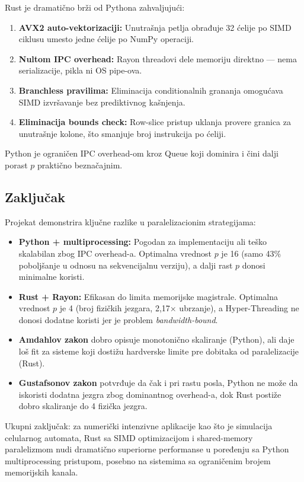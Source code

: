 \documentclass[12pt,a4paper]{article}
\begin{document}
Rust je dramatično brži od Pythona zahvaljujući:
\begin{enumerate}[noitemsep]
    \item \textbf{AVX2 auto-vektorizaciji:} Unutrašnja petlja obrađuje 32 ćelije po SIMD ciklusu
          umesto jedne ćelije po NumPy operaciji.
    \item \textbf{Nultom IPC overhead:} Rayon threadovi dele memoriju direktno --- nema serializacije,
          pikla ni OS pipe-ova.
    \item \textbf{Branchless pravilima:} Eliminacija conditionalnih grananja omogućava SIMD izvršavanje
          bez prediktivnog kašnjenja.
    \item \textbf{Eliminacija bounds check:} Row-slice pristup uklanja provere granica za unutrašnje
          kolone, što smanjuje broj instrukcija po ćeliji.
\end{enumerate}

Python je ograničen IPC overhead-om kroz Queue koji dominira i čini dalji porast $p$
praktično beznačajnim.

\subsection{Zaključak}

Projekat demonstrira ključne razlike u paralelizacionim strategijama:

\begin{itemize}
    \item \textbf{Python + multiprocessing:} Pogodan za implementaciju ali teško skalabilan
          zbog IPC overhead-a. Optimalna vrednost $p$ je 16 (samo 43\% poboljšanje u odnosu na
          sekvencijalnu verziju), a dalji rast $p$ donosi minimalne koristi.

    \item \textbf{Rust + Rayon:} Efikasan do limita memorijske magistrale. Optimalna vrednost $p$
          je 4 (broj fizičkih jezgara, 2{,}17$\times$ ubrzanje), a Hyper-Threading ne donosi
          dodatne koristi jer je problem \emph{bandwidth-bound}.

    \item \textbf{Amdahlov zakon} dobro opisuje monotonično skaliranje (Python), ali daje
          loš fit za sisteme koji dostižu hardverske limite pre dobitaka od paralelizacije (Rust).

    \item \textbf{Gustafsonov zakon} potvrđuje da čak i pri rastu posla, Python ne može
          da iskoristi dodatna jezgra zbog dominantnog overhead-a, dok Rust postiže dobro
          skaliranje do 4 fizička jezgra.
\end{itemize}

Ukupni zaključak: za numerički intenzivne aplikacije kao što je simulacija celularnog automata,
Rust sa SIMD optimizacijom i shared-memory paralelizmom nudi dramatično superiorne performanse
u poređenju sa Python multiprocessing pristupom, posebno na sistemima sa ograničenim brojem
memorijskih kanala.
\end{document}
